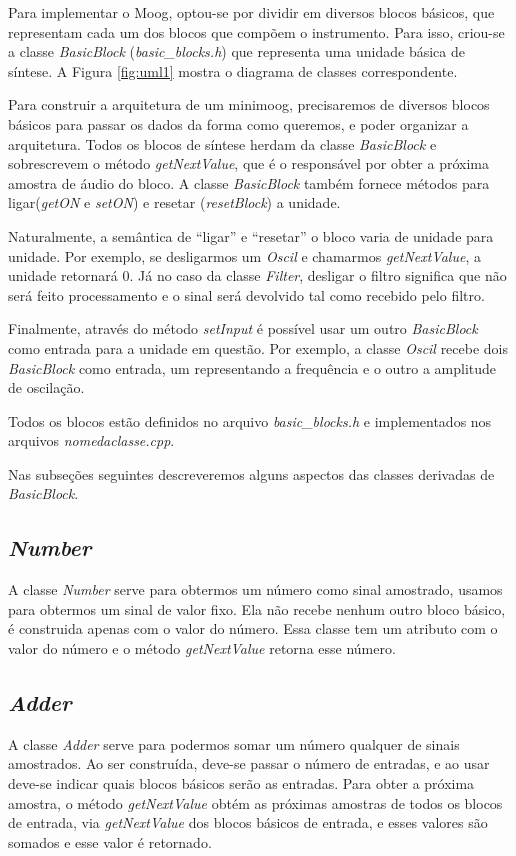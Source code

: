 \documentclass{article}
\begin{document}
Para implementar o Moog, optou-se por dividir em diversos blocos básicos, 
que representam cada um dos blocos que compõem o instrumento. Para isso, 
criou-se a classe \emph{BasicBlock} (\emph{basic\_blocks.h}) que representa 
uma unidade básica de síntese. A Figura \ref{fig:uml1} mostra o diagrama 
de classes correspondente.


Para construir a arquitetura de um minimoog, precisaremos de diversos blocos básicos para passar os dados da forma como queremos,
 e poder organizar a arquitetura.
Todos os blocos de síntese herdam da classe \emph{BasicBlock} e sobrescrevem 
o método \emph{getNextValue}, que é o responsável por obter a próxima 
amostra de áudio do bloco. A classe \emph{BasicBlock} também fornece métodos 
para ligar(\emph{getON} e \emph{setON}) e resetar (\emph{resetBlock}) a unidade.

Naturalmente, a semântica de ``ligar'' e ``resetar'' o bloco varia de unidade para unidade. 
Por exemplo, se desligarmos um \emph{Oscil} e chamarmos \emph{getNextValue}, a unidade 
retornará $0$. Já no caso da classe \emph{Filter}, desligar o filtro significa que não 
será feito processamento e o sinal será devolvido tal como recebido pelo filtro. 

Finalmente, através do método \emph{setInput} é possível usar um outro \emph{BasicBlock} 
como entrada para a unidade em questão. Por exemplo, a classe \emph{Oscil} recebe 
dois \emph{BasicBlock} como entrada, um representando a frequência e o outro 
a amplitude de oscilação.

Todos os blocos estão definidos no arquivo \emph{basic\_blocks.h} e implementados nos arquivos \emph{nomedaclasse.cpp}.

Nas subseções seguintes descreveremos alguns aspectos das classes derivadas de \emph{BasicBlock}.

\subsection{\emph{Number}}
A classe \emph{Number} serve para obtermos um número como sinal amostrado, usamos para obtermos um sinal de valor fixo. 
Ela não recebe nenhum outro bloco básico, é construida apenas com o valor do número. Essa classe tem um atributo com o valor do número 
e o método \emph{getNextValue} retorna esse número.
\subsection{\emph{Adder}}
A classe \emph{Adder} serve para podermos somar um número qualquer de sinais amostrados. Ao ser construída, deve-se passar o número de entradas,
 e ao usar deve-se indicar quais blocos básicos serão as entradas. Para obter a próxima amostra, o método \emph{getNextValue} obtém as próximas amostras de 
todos os blocos de entrada, via \emph{getNextValue} dos blocos básicos de entrada, e esses valores são somados e esse valor é retornado.
\end{document}
